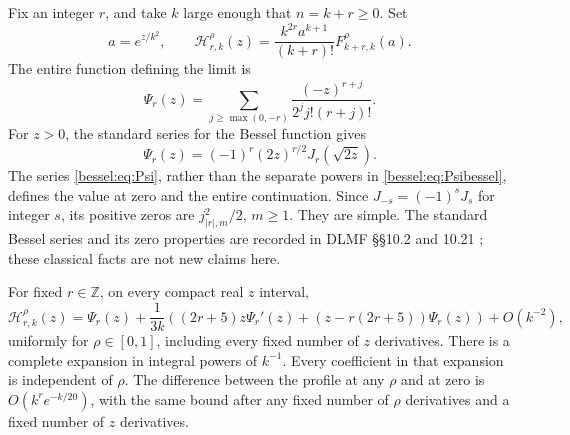Fix an integer $r$, and take $k$ large enough that $n=k+r\geq0$. Set
\begin{equation}\label{bessel:eq:profile}
 a=e^{z/k^2},\qquad
 \mathcal H_{r,k}^{\rho}(z)
   =\frac{k^{2r}a^{k+1}}{(k+r)!}F_{k+r,k}^{\rho}(a).
\end{equation}
The entire function defining the limit is
\begin{equation}\label{bessel:eq:Psi}
 \Psi_r(z)=\sum_{j\geq\max(0,-r)}
       \frac{(-z)^{r+j}}{2^j j!(r+j)!}.
\end{equation}
For $z>0$, the standard series for the Bessel function gives
\begin{equation}\label{bessel:eq:Psibessel}
 \Psi_r(z)=(-1)^r(2z)^{r/2}J_r(\sqrt{2z}).
\end{equation}
The series \eqref{bessel:eq:Psi}, rather than the separate powers in
\eqref{bessel:eq:Psibessel}, defines the value at zero and the entire
continuation. Since $J_{-s}=(-1)^sJ_s$ for integer $s$, its positive
zeros are $j_{|r|,m}^2/2$, $m\geq1$. They are simple. The standard
Bessel series and its zero properties are recorded in DLMF
\S\S10.2 and 10.21 \cite{DLMFbessel}; these classical facts are not new claims here.

\begin{theorem}
\label{bessel:thm:profile}
For fixed $r\in\mathbb Z$, on every compact real $z$ interval,
\begin{equation}\label{bessel:eq:profileexp}
 \mathcal H_{r,k}^{\rho}(z)
 =\Psi_r(z)+\frac{1}{3k}\left((2r+5)z\Psi_r'(z)
       +(z-r(2r+5))\Psi_r(z)\right)+O(k^{-2}),
\end{equation}
uniformly for $\rho\in[0,1]$, including every fixed number of $z$
derivatives. There is a complete expansion in integral powers of
$k^{-1}$. Every coefficient in that expansion is independent of $\rho$.
The difference between the profile at any $\rho$ and at zero is
$O(k^r e^{-k/20})$, with the same bound after any fixed number of
$\rho$ derivatives and a fixed number of $z$ derivatives.
\end{theorem}

